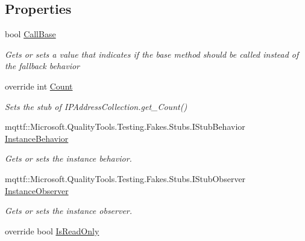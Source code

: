 \subsection*{Properties}
\begin{DoxyCompactItemize}
\item 
bool \hyperlink{class_system_1_1_net_1_1_network_information_1_1_fakes_1_1_stub_i_p_address_collection_a916483dd5555cf506d617bfa877db3b4}{Call\-Base}
\begin{DoxyCompactList}\small\item\em Gets or sets a value that indicates if the base method should be called instead of the fallback behavior\end{DoxyCompactList}\item 
override int \hyperlink{class_system_1_1_net_1_1_network_information_1_1_fakes_1_1_stub_i_p_address_collection_a5026d0b04cb9c385b6211e22dd41c524}{Count}
\begin{DoxyCompactList}\small\item\em Sets the stub of I\-P\-Address\-Collection.\-get\-\_\-\-Count()\end{DoxyCompactList}\item 
mqttf\-::\-Microsoft.\-Quality\-Tools.\-Testing.\-Fakes.\-Stubs.\-I\-Stub\-Behavior \hyperlink{class_system_1_1_net_1_1_network_information_1_1_fakes_1_1_stub_i_p_address_collection_a228d1822b7c7ef42a86b6fc132095f01}{Instance\-Behavior}
\begin{DoxyCompactList}\small\item\em Gets or sets the instance behavior.\end{DoxyCompactList}\item 
mqttf\-::\-Microsoft.\-Quality\-Tools.\-Testing.\-Fakes.\-Stubs.\-I\-Stub\-Observer \hyperlink{class_system_1_1_net_1_1_network_information_1_1_fakes_1_1_stub_i_p_address_collection_a513776d93eb2e4bafb38df6a13ea662f}{Instance\-Observer}
\begin{DoxyCompactList}\small\item\em Gets or sets the instance observer.\end{DoxyCompactList}\item 
override bool \hyperlink{class_system_1_1_net_1_1_network_information_1_1_fakes_1_1_stub_i_p_address_collection_a047c3969af23d7867a610b1b191cc027}{Is\-Read\-Only}

\end{DoxyCompactItemize}
